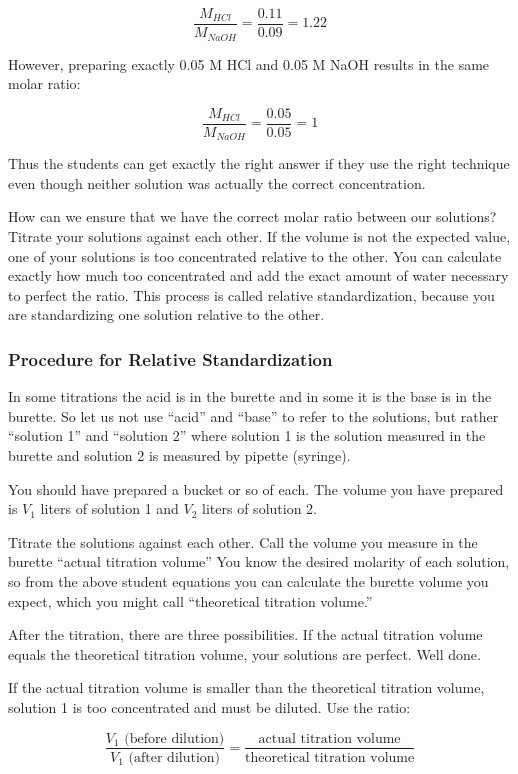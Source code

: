 \[ \frac{M_{HCl}}{M_{NaOH}} = \frac{0.11}{0.09} = 1.22 \]

However, preparing exactly 0.05 M HCl and 0.05 M NaOH results in the same molar ratio:

\[ \frac{M_{HCl}}{M_{NaOH}} = \frac{0.05}{0.05} = 1 \]

Thus the students can get exactly the right answer if they use the right technique even though neither solution was actually the correct concentration.

How can we ensure that we have the correct molar ratio between our solutions? Titrate your solutions against each other. If the volume is not the expected value, one of your solutions is too concentrated relative to the other. You can calculate exactly how much too concentrated and add the exact amount of water necessary to perfect the ratio. This process is called relative standardization, because you are standardizing one solution relative to the other.

\subsubsection{Procedure for Relative Standardization}

In some titrations the acid is in the burette and in some it is the base is in the burette. So let us not use ``acid'' and ``base'' to refer to the solutions, but rather ``solution 1'' and ``solution 2'' where solution 1 is the solution measured in the burette and solution 2 is measured by pipette (syringe).

You should have prepared a bucket or so of each. The volume you have prepared is $ V_{1} $ liters of solution 1 and $ V_{2} $ liters of solution 2.

Titrate the solutions against each other. Call the volume you measure in the burette ``actual titration volume'' You know the desired molarity of each solution, so from the above student equations you can calculate the burette volume you expect, which you might call ``theoretical titration volume.''

After the titration, there are three possibilities. If the actual titration volume equals the theoretical titration volume, your solutions are perfect. Well done.

If the actual titration volume is smaller than the theoretical titration volume, solution 1 is too concentrated and must be diluted. Use the ratio:

\[ \frac{V_{1} \mbox{ (before dilution)}}{V_{1} \mbox{ (after dilution)}} = \frac{\mbox{actual titration volume}}{\mbox{theoretical titration volume}} \]

